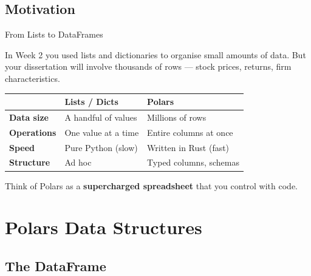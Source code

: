 \documentclass[9pt,aspectratio=169]{beamer}
\begin{document}
\subsection{Motivation}
\begin{frame}{From Lists to DataFrames}

In Week 2 you used lists and dictionaries to organise small amounts of data. But your dissertation will involve \alert{thousands of rows} --- stock prices, returns, firm characteristics.

\medskip

\begin{tabular}{@{}llp{5.5cm}@{}}
\toprule
 & \textbf{Lists / Dicts} & \textbf{Polars} \\
\midrule
\textbf{Data size} & A handful of values & Millions of rows \\[0.3em]
\textbf{Operations} & One value at a time & Entire columns at once \\[0.3em]
\textbf{Speed} & Pure Python (slow) & Written in Rust (fast) \\[0.3em]
\textbf{Structure} & Ad hoc & Typed columns, schemas \\
\bottomrule
\end{tabular}

\bigskip

Think of Polars as a \textbf{supercharged spreadsheet} that you control with code.

\end{frame}


\section{Polars Data Structures}
\subsection{The DataFrame}
\end{document}
